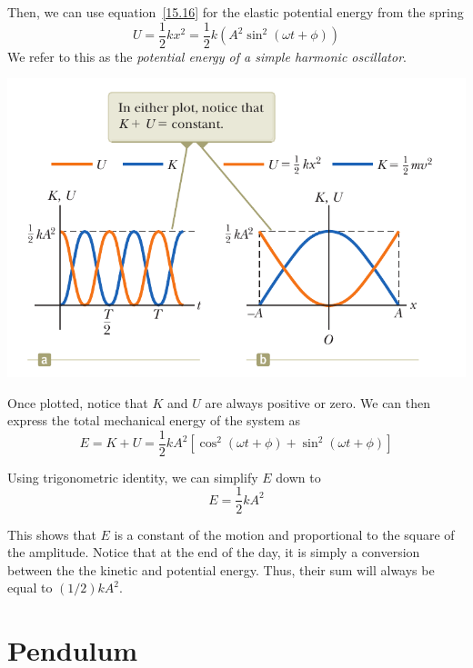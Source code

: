 Then, we can use equation~\eqref{15.16} for the elastic potential energy from the spring
\begin{equation}\label{15.20}
    U = \frac{1}{2}kx^2 = \frac{1}{2}k\left(A^2 \sin^2(\omega t + \phi)\right)
\end{equation}
We refer to this as the \textit{potential energy of a simple harmonic oscillator}.

\begin{center}\label{fig15.9}
\includegraphics[scale=0.5]{images/oaw/fig15_9.png}
\end{center}
Once plotted, notice that $K$ and $U$ are always positive or zero. We can then express the total
mechanical energy of the system as 
\begin{equation}\label{fullE}
    E = K + U = \frac{1}{2}kA^2\left[ \cos^2(\omega t + \phi) + \sin^2(\omega t + \phi) \right]
\end{equation}

Using trigonometric identity, we can simplify $E$ down to 
\begin{equation}\label{15.21}
    E = \frac{1}{2}kA^2
\end{equation}

This shows that $E$ is a constant of the motion and proportional to the square of the amplitude.
Notice that at the end of the day, it is simply a conversion between the the kinetic and potential
energy. Thus, their sum will always be equal to $(1/2)kA^2$.

\section{Pendulum}

